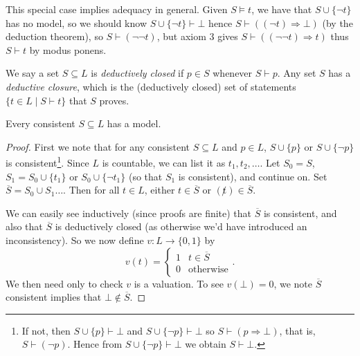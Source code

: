 \documentclass[a3paper, 10pt]{article}
\renewcommand{\vocab}[1]{\emph{#1}}
\begin{document}
\begin{multicols*}{5}
This special case implies adequacy in general. Given $S \models t$, we have that $S \cup \{\lnot t\}$ has no model, so we should know $S \cup \{\lnot t \} \vdash \bot$ hence $S \vdash ((\lnot t) \Rightarrow \bot)$ (by the deduction theorem), so $S \vdash (\lnot \lnot t)$, but axiom 3 gives $S \vdash ((\lnot \lnot t) \Rightarrow t)$ thus $S \vdash t$ by modus ponens.

\begin{definition}
  We say a set $S \subseteq L$ is \vocab{deductively closed} if $p \in S$ whenever $S \vdash p$. Any set $S$ has a \vocab{deductive closure}, which is the (deductively closed) set of statements $\{t \in L \mid S \vdash t\}$ that $S$ proves. 
\end{definition}


\begin{theorem}
Every consistent $S \subseteq L$ has a model.
\end{theorem}
\begin{proof}
  First we note that for any consistent $S \subseteq L$ and $p \in L$, $S \cup \{p\}$ or $S \cup \{\lnot p\}$ is consistent\footnote{If not, then $S \cup \{p\} \vdash \bot$ and $S \cup \{\lnot p\} \vdash \bot$ so $S \vdash (p \Rightarrow \bot)$, that is, $S \vdash (\lnot p)$. Hence from $S \cup \{\lnot p\} \vdash \bot$ we obtain $S \vdash \bot$.}. Since $L$ is countable, we can list it as $t_1, t_2, \dots$. 
  Let $S_0 = S$, $S_1 = S_0 \cup \{t_1\}$ or $S_0 \cup \{\lnot t_1\}$ (so that $S_1$ is consistent), and continue on. Set $\overline{S} = S_0 \cup S_1 \dots$. Then for all $t \in L$, either $t \in \overline{S}$ or $(\not t) \in \overline{S}$.

  We can easily see inductively (since proofs are finite) that $\overline{S}$ is consistent, and also that $\overline{S}$ is deductively closed (as otherwise we'd have introduced an inconsistency). So we now define $v: L \rightarrow \{0, 1\}$ by
  $$
  v(t) = \begin{cases}
        1 & t \in \overline{S}\\
        0 & \text{otherwise}
       \end{cases}.
  $$
  We then need only to check $v$ is a valuation. To see $v(\bot) = 0$, we note $\overline{S}$ consistent implies that $\bot \not \in \overline{S}$. 


\end{proof}
\end{multicols*}
\end{document}
